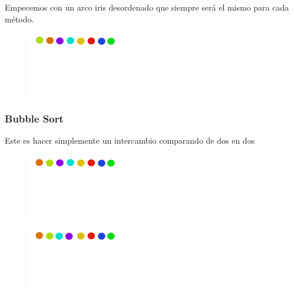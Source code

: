 \documentclass[12pt, fleqn]{report}                             %
\theoremstyle{break}                                            %
\begin{document}
                    
        Empecemos con un arco iris desordenado que siempre será el mismo para cada método.
        
            	\begin{figure}[h]
                        \centering
                        \includegraphics[width=0.4\textwidth]{graphics/Desorden2.png}
                    \end{figure}
    	
    	\subsubsection{Bubble Sort}
    	Este es hacer simplemente un intercambio comparando de dos en dos
    	    
    	    	\begin{figure}[h]
                        \centering
                        \includegraphics[width=0.4\textwidth]{graphics/Burbuja1-1.png}
                    \end{figure}
                \begin{figure}[h]
                        \centering
                        \includegraphics[width=0.4\textwidth]{graphics/Burbuja1-3.png}
                    \end{figure}
                     \clearpage
\end{document}
